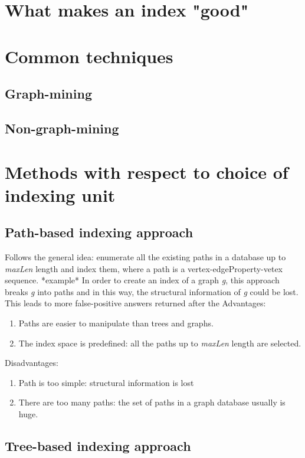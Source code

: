 \documentclass{l4proj}
\newcounter{example}[section]
\begin{document}
    \section{What makes an index "good"}
	\section{Common techniques}
    	\subsection{Graph-mining}
    	\subsection{Non-graph-mining}
        \label{subsec:non-data-mining}
    \section{Methods with respect to choice of indexing unit}
        \subsection{Path-based indexing approach}
        Follows the general idea: enumerate all the existing paths in a database up to \textit{maxLen} length and index them, where a path is a vertex-edgeProperty-vetex sequence. *example*
        In order to create an index of a graph \textit{g}, this approach breaks \textit{g} into paths and in this way, the structural information of \textit{g} could be lost. This leads to more false-positive answers returned after the   
        Advantages:
        \begin{enumerate}
            \item Paths are easier to manipulate than trees and graphs.
            \item The index space is predefined: all the paths up to             \textit{maxLen} length are selected.
        \end{enumerate}
        
        Disadvantages:
        \begin{enumerate}
            \item Path is too simple: structural information is lost
            \item There are too many paths: the set of paths in a graph database usually is huge.
        \end{enumerate}
        \subsection{Tree-based indexing approach}
        
\end{document}
